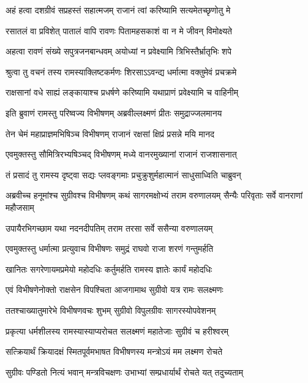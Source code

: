 \twolineshloka
{अहं हत्वा दशग्रीवं सप्रहस्तं सहात्मजम्}
{राजानं त्वां करिष्यामि सत्यमेतच्छृणोतु मे} %

\twolineshloka
{रसातलं वा प्रविशेत् पातालं वापि रावणः}
{पितामहसकाशं वा न मे जीवन् विमोक्ष्यते} %

\twolineshloka
{अहत्वा रावणं संख्ये सपुत्रजनबान्धवम्}
{अयोध्यां न प्रवेक्ष्यामि त्रिभिस्तैर्भ्रातृभिः शपे} %

\twolineshloka
{श्रुत्वा तु वचनं तस्य रामस्याक्लिष्टकर्मणः}
{शिरसाऽऽवन्द्य धर्मात्मा वक्तुमेवं प्रचक्रमे} %

\twolineshloka
{राक्षसानां वधे साह्यं लङ्कायाश्च प्रधर्षणे}
{करिष्यामि यथाप्राणं प्रवेक्ष्यामि च वाहिनीम्} %

\twolineshloka
{इति ब्रुवाणं रामस्तु परिष्वज्य विभीषणम्}
{अब्रवील्लक्ष्मणं प्रीतः समुद्राज्जलमानय} %

\twolineshloka
{तेन चेमं महाप्राज्ञमभिषिञ्च विभीषणम्}
{राजानं रक्षसां क्षिप्रं प्रसन्ने मयि मानद} %

\twolineshloka
{एवमुक्तस्तु सौमित्रिरभ्यषिञ्चद् विभीषणम्}
{मध्ये वानरमुख्यानां राजानं राजशासनात्} %

\twolineshloka
{तं प्रसादं तु रामस्य दृष्ट्वा सद्यः प्लवङ्गमाः}
{प्रचुक्रुशुर्महात्मानं साधुसाध्विति चाब्रुवन्} %

\threelineshloka
{अब्रवीच्च हनूमांश्च सुग्रीवश्च विभीषणम्}
{कथं सागरमक्षोभ्यं तराम वरुणालयम्}
{सैन्यैः परिवृताः सर्वे वानराणां महौजसाम्} %

\twolineshloka
{उपायैरभिगच्छाम यथा नदनदीपतिम्}
{तराम तरसा सर्वे ससैन्या वरुणालयम्} %

\twolineshloka
{एवमुक्तस्तु धर्मात्मा प्रत्युवाच विभीषणः}
{समुद्रं राघवो राजा शरणं गन्तुमर्हति} %

\twolineshloka
{खानितः सगरेणायमप्रमेयो महोदधिः}
{कर्तुमर्हति रामस्य ज्ञातेः कार्यं महोदधिः} %

\twolineshloka
{एवं विभीषणेनोक्तो राक्षसेन विपश्चिता}
{आजगामाथ सुग्रीवो यत्र रामः सलक्ष्मणः} %

\twolineshloka
{ततश्चाख्यातुमारेभे विभीषणवचः शुभम्}
{सुग्रीवो विपुलग्रीवः सागरस्योपवेशनम्} %

\twolineshloka
{प्रकृत्या धर्मशीलस्य रामस्यास्याप्यरोचत}
{सलक्ष्मणं महातेजाः सुग्रीवं च हरीश्वरम्} %

\twolineshloka
{सत्क्रियार्थं क्रियादक्षं स्मितपूर्वमभाषत}
{विभीषणस्य मन्त्रोऽयं मम लक्ष्मण रोचते} %

\twolineshloka
{सुग्रीवः पण्डितो नित्यं भवान् मन्त्रविचक्षणः}
{उभाभ्यां सम्प्रधार्यार्थं रोचते यत् तदुच्यताम्} %


